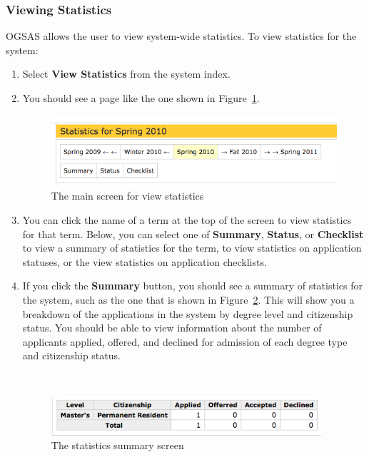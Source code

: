 \documentclass[titlepage]{article}
\begin{document}
\subsubsection{Viewing Statistics}
OGSAS allows the user to view system-wide statistics. To view statistics for the system:

\begin{enumerate}

\item Select \textbf{\textsf{View Statistics}} from the system index.
\item You should see a page like the one shown in Figure~\ref{tStats1}.

\begin{figure}[h!]
  \begin{center}
  \includegraphics[width=11cm]{stats1.png}
  \end{center}
  \caption{The main screen for view statistics}
  \label{tStats1}
\end{figure}

\item You can click the name of a term at the top of the screen to view statistics for that term. Below, you can select one of \textbf{\textsf{Summary}}, \textbf{\textsf{Status}}, or \textbf{\textsf{Checklist}} to view a summary of statistics for the term, to view statistics on application statuses, or the view statistics on application checklists.

\item If you click the \textbf{\textsf{Summary}} button, you should see a summary of statistics for the system, such as the one that is shown in Figure~\ref{tStats2}. This will show you a breakdown of the applications in the system by degree level and citizenship status. You should be able to view information about the number of applicants applied, offered, and declined for admission of each degree type and citizenship status.

\begin{figure}[h!]
\  \begin{center}
  \includegraphics[width=10cm]{stats2.png}
  \end{center}
  \caption{The statistics summary screen}
  \label{tStats2}
\end{figure}


\end{enumerate}
\end{document}
